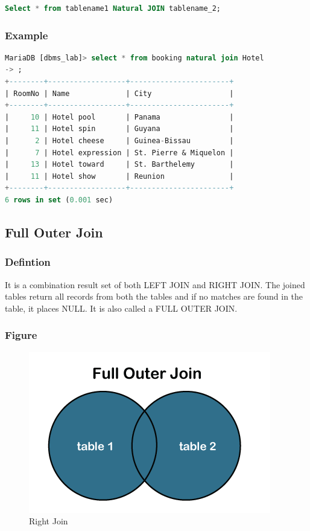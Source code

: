 \documentclass[11pt]{article}
\begin{document}
\begin{lstlisting}[language=sql]
Select * from tablename1 Natural JOIN tablename_2;  
\end{lstlisting}

\subsubsection*{Example}

\begin{lstlisting}[language=sql]
MariaDB [dbms_lab]> select * from booking natural join Hotel
-> ;
+--------+------------------+-----------------------+
| RoomNo | Name             | City                  |
+--------+------------------+-----------------------+
|     10 | Hotel pool       | Panama                |
|     11 | Hotel spin       | Guyana                |
|      2 | Hotel cheese     | Guinea-Bissau         |
|      7 | Hotel expression | St. Pierre & Miquelon |
|     13 | Hotel toward     | St. Barthelemy        |
|     11 | Hotel show       | Reunion               |
+--------+------------------+-----------------------+
6 rows in set (0.001 sec)
\end{lstlisting}

\subsection{Full Outer Join}

\subsubsection*{Defintion}

It is a combination result set of both LEFT JOIN and RIGHT JOIN. The joined tables return all records from both the tables and if no matches are found in the table, it places NULL. It is also called a FULL OUTER JOIN.


\subsubsection*{Figure}

\begin{figure}[H]
	\centering
	\includegraphics[width=.45\textwidth]{full outer join.png}
	\caption{ Right Join}
\end{figure}
\end{document}
